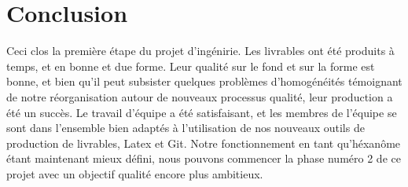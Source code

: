 \documentclass[a4paper]{article}
\begin{document}
\section{Conclusion}

Ceci clos la première étape du projet d'ingénirie. Les livrables ont été produits à temps, et en bonne et due forme. Leur qualité sur le fond et sur la forme est bonne, et bien qu'il peut subsister quelques problèmes d'homogénéités témoignant de notre réorganisation autour de nouveaux processus qualité, leur production a été un succès. Le travail d'équipe a été satisfaisant, et les membres de l'équipe se sont dans l'ensemble bien adaptés à l'utilisation de nos nouveaux outils de production de livrables, Latex et Git. Notre fonctionnement en tant qu'héxanôme étant maintenant mieux défini, nous pouvons commencer la phase numéro 2 de ce projet avec un objectif qualité encore plus ambitieux.
\end{document}
